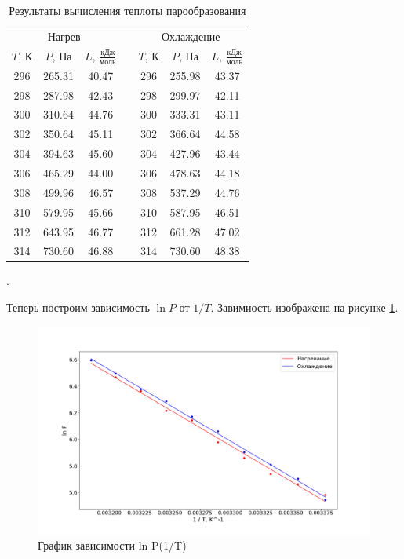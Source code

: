 \documentclass[a4paper, 12pt]{article}
\newcounter{Points}
\newcommand{\point}{\arabic{Points}. \addtocounter{Points}{1}}
\begin{document}
\begin{table}[h]
	\centering
	\begin{tabular}{|c|c|c|c|c|c|c|}
		\cline{1-3} \cline{5-7}
		\multicolumn{3}{|c|}{Нагрев} &  & \multicolumn{3}{c|}{Охлаждение} \\ \cline{1-3} \cline{5-7}

		$ T $, К & $ P $, Па & $ L $, $ \frac{\text{кДж}}{\text{моль}} $ &  & $ T $, К & $ P $, Па & $ L $, $ \frac{\text{кДж}}{\text{моль}} $ \\ \cline{1-3} \cline{5-7} 
        296	& 265.31	& 40.47	& 	& 296	& 255.98	& 43.37	\\ \cline{1-3} \cline{5-7}
        298	& 287.98	& 42.43	& 	& 298	& 299.97	& 42.11	\\ \cline{1-3} \cline{5-7}
        300	& 310.64	& 44.76	& 	& 300	& 333.31	& 43.11	\\ \cline{1-3} \cline{5-7}
        302	& 350.64	& 45.11	& 	& 302	& 366.64	& 44.58	\\ \cline{1-3} \cline{5-7}
        304	& 394.63	& 45.60	& 	& 304	& 427.96	& 43.44	\\ \cline{1-3} \cline{5-7}
        306	& 465.29	& 44.00	& 	& 306	& 478.63	& 44.18	\\ \cline{1-3} \cline{5-7}
        308	& 499.96	& 46.57	& 	& 308	& 537.29	& 44.76	\\ \cline{1-3} \cline{5-7}
        310	& 579.95	& 45.66	& 	& 310	& 587.95	& 46.51	\\ \cline{1-3} \cline{5-7}
        312	& 643.95	& 46.77	& 	& 312	& 661.28	& 47.02	\\ \cline{1-3} \cline{5-7}
        314	& 730.60	& 46.88	& 	& 314	& 730.60	& 48.38	\\ \cline{1-3} \cline{5-7}
        
	\end{tabular}
	\caption{Результаты вычисления теплоты парообразования}
	\label{tab:par}
\end{table}

\point Теперь построим зависимость $ \ln P $ от $ 1 / T $. Завимиость изображена на рисунке \ref{lnP_from_1_over_T}.

\begin{figure}
    \centering    
    \includegraphics[width=18cm]{ln_p_from_1_over_T.png}
    \caption{График зависимости ln P(1/T)}
    \label{lnP_from_1_over_T}
\end{figure}
\end{document}
